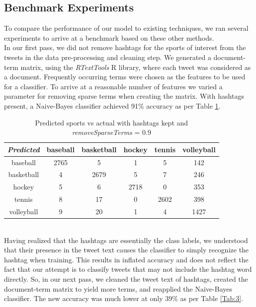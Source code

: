 \documentclass[journal, a4paper]{IEEEtran}
\begin{document}
\subsection{Benchmark Experiments}
To compare the performance of our model to existing techniques, we ran several experiments to arrive at a  benchmark based on these other methods.\\
In our first pass, we did not remove hashtags for the sports of interest from the tweets in the data pre-processing and cleaning step. We generated a document-term matrix, using the \textit{RTextTools} R library, where each tweet was considered as a document. Frequently occurring terms were chosen as the features to be used for a classifier. To arrive at a reasonable number of features we varied a parameter for removing sparse terms when creating the matrix. With hashtags present, a Naive-Bayes classifier achieved 91\% accuracy as per Table \ref{Tab:2}.
\begin{table}[!ht]
	\begin{center}
		\begin{tabular}{|c|c c c c c|}
			\hline
			\textit{Predicted}& baseball & basketball & hockey & tennis& volleyball\\
			\hline
			baseball & 2765 & 5 & 1 & 5 &142\\
			basketball & 4 & 2679&5& 7& 246\\
			hockey & 5 & 6 & 2718 & 0 & 353\\
			tennis & 8 & 17 & 0 & 2602 & 398\\
			volleyball & 9 & 20&  1 & 4 &1427\\
			\hline
		\end{tabular}
	\end{center}
	\caption{Predicted sports vs actual with hashtags kept and \textit{removeSparseTerms} = 0.9}\label{Tab:2}
\end{table}\\
Having realized that the hashtags are essentially the class labels, we understood that their presence in the tweet text causes the classifier to simply recognize the hashtag when training. This results in inflated accuracy and does not reflect the fact that our attempt is to classify tweets that may not include the hashtag word directly. So, in our next pass, we cleaned the tweet text of hashtags, created the document-term matrix to yield more terms, and reapplied the Naive-Bayes classifier. The new accuracy was much lower at only 39\% as per Table \ref{Tab:3}.
\end{document}
